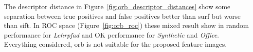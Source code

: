 The descriptor distance in Figure~\ref{fig:orb_descriptor_distances} show some separation between true positives and false positives better than \acrshort{surf} but worse than \acrshort{sift}.
In ROC space (Figure~\ref{fig:orb_roc}) these mixed result show in random performance for \emph{Lehrpfad} and OK performance for \emph{Synthetic} and \emph{Office}.
Everything considered, \acrshort{orb} is not suitable for the proposed feature images.
